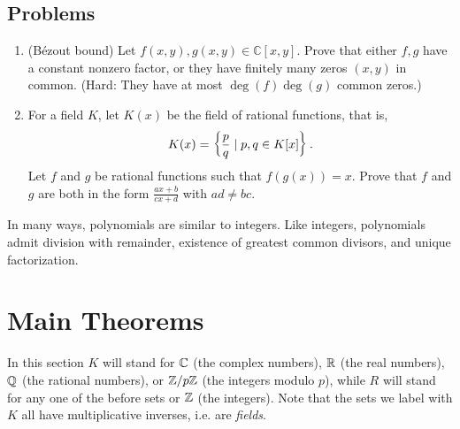 \subsection{Problems}
\begin{enumerate}
\item
(B\'{e}zout bound) Let $f(x,y),g(x,y)\in \mathbb C [x,y]$. Prove that either $f,g$ have a constant nonzero factor, or they have finitely many zeros $(x,y)$ in common. (Hard: They have at most $\deg(f)\deg(g)$ common zeros.)
\item
For a field $K$, let $K(x)$ be the field of rational functions, that is,
\[K(x)=\left\{ {\frac pq\mid p,q\in K[x]} \right\}.\]
Let $f$ and $g$ be rational functions such that $f(g(x))=x$. Prove that $f$ and $g$ are both in the form $\frac{ax+b}{cx+d}$ with $ad\neq bc$.
\end{enumerate}

In many ways, polynomials are similar to integers. Like integers, polynomials admit division with remainder, existence of greatest common divisors, and unique factorization.

\section{Main Theorems}\label{poly2s1}
In this section $K$ will stand for $\mathbb{C}$ (the complex numbers), $\mathbb{R}$ (the real numbers), $\mathbb{Q}$ (the rational numbers), or $\mathbb{Z}/p\mathbb{Z}$ (the integers modulo $p$), while $R$ will stand for any one of the before sets or $\mathbb{Z}$ (the integers). Note that the sets we label with $K$ all have multiplicative inverses, i.e. are {\it fields}.

